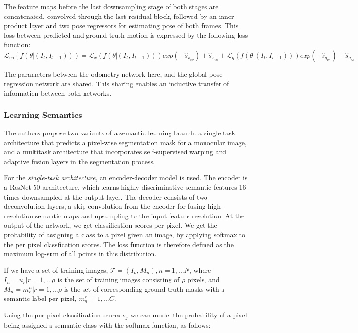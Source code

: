 The feature maps before the last downsampling stage of both stages are concatenated, convolved through the last residual block, followed by an inner product layer
and two pose regressors for estimating pose of both frames. This loss between predicted and ground truth motion is expressed by the following loss function:
\[ \mathcal{L}_{vo}(\mathbf{\mathit{f}}(\theta|(\mathit{I}_t, \mathit{I}_{t-1})
)) = \mathcal{L}_{x}(\mathbf{\mathit{f}}(\theta|(\mathit{I}_t, \mathit{I}_{t-1})
))exp(-\hat{s}_{x_{vo}}) + \hat{s}_{x_{vo}}
+ \mathcal{L}_{q}(\mathbf{\mathit{f}}(\theta|(\mathit{I}_t, \mathit{I}_{t-1})
))exp(-\hat{s}_{q_{vo}}) + \hat{s}_{q_{vo}}\]
  
The parameters between the odometry network here, and the global pose regression network are shared. This sharing enables an inductive transfer of information between
both networks. 

\subsubsection{Learning Semantics}
The authors propose two variants of a semantic learning branch: a single task architecture that predicts a pixel-wise segmentation mask for a monocular image, 
and a multitask architecture that incorporates self-supervised warping and adaptive fusion layers in the segmentation process. 


For the \emph{single-task architecture}, an encoder-decoder model is used. The encoder is a ResNet-50 architecture, which learns highly discriminative semantic features
16 times downsampled at the output layer. The decoder consists of two deconvolution layers, a skip convolution from the encoder for fusing high-resolution semantic maps
and upsampling to the input feature resolution. At the output of the network, we get classification scores per pixel. We get the probability of assigning a class to 
a pixel given an image, by applying softmax to the per pixel classfication scores. The loss function is therefore defined as the maximum log-sum of all points in this distribution. 


If we have a set of training images, $\mathcal{T} = {(I_n, M_n), n = 1,...N}$, where $I_n = {u_r | r = 1,...\rho}$ is the set of training images consisting of $\rho$ pixels, and $M_n = {m^n_r | r = 1,...\rho}$ is the set of corresponding ground truth masks with a semantic label per pixel, $m_n^r = {1,...C}$.

Using the per-pixel classification scores $s_j$ we can model the probability of a pixel being assigned a semantic class with the softmax function, as follows:

